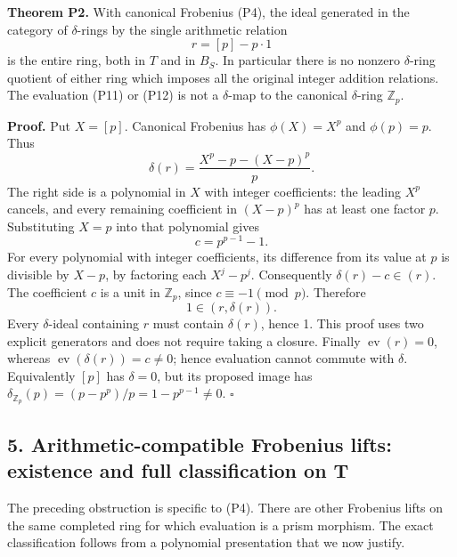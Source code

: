 \documentclass[
]{article}
\begin{document}
\textbf{Theorem P2.} With canonical Frobenius (P4), the ideal generated
in the category of \(\delta\)-rings by the single arithmetic relation \[
r=[p]-p\cdot1
\tag{P13}
\] is the entire ring, both in \(T\) and in \(B_S\). In particular there
is no nonzero \(\delta\)-ring quotient of either ring which imposes all
the original integer addition relations. The evaluation (P11) or (P12)
is not a \(\delta\)-map to the canonical \(\delta\)-ring
\(\mathbb Z_p\).

\textbf{Proof.} Put \(X=[p]\). Canonical Frobenius has \(\phi(X)=X^p\)
and \(\phi(p)=p\). Thus \[
\delta(r)=\frac{X^p-p-(X-p)^p}{p}.
\tag{P14}
\] The right side is a polynomial in \(X\) with integer coefficients:
the leading \(X^p\) cancels, and every remaining coefficient in
\((X-p)^p\) has at least one factor \(p\). Substituting \(X=p\) into
that polynomial gives \[
c=p^{p-1}-1.
\tag{P15}
\] For every polynomial with integer coefficients, its difference from
its value at \(p\) is divisible by \(X-p\), by factoring each
\(X^j-p^j\). Consequently \(\delta(r)-c\in(r)\). The coefficient \(c\)
is a unit in \(\mathbb Z_p\), since \(c\equiv-1\pmod p\). Therefore \[
1\in(r,\delta(r)).
\tag{P16}
\] Every \(\delta\)-ideal containing \(r\) must contain \(\delta(r)\),
hence 1. This proof uses two explicit generators and does not require
taking a closure. Finally \(\operatorname{ev}(r)=0\), whereas
\(\operatorname{ev}(\delta(r))=c\ne0\); hence evaluation cannot commute
with \(\delta\). Equivalently \([p]\) has \(\delta=0\), but its proposed
image has \(\delta_{\mathbb Z_p}(p)=(p-p^p)/p=1-p^{p-1}\ne0\).
\(\square\)

\subsection{5. Arithmetic-compatible Frobenius lifts: existence and full
classification on
T}\label{arithmetic-compatible-frobenius-lifts-existence-and-full-classification-on-t}

The preceding obstruction is specific to (P4). There are other Frobenius
lifts on the same completed ring for which evaluation is a prism
morphism. The exact classification follows from a polynomial
presentation that we now justify.
\end{document}
